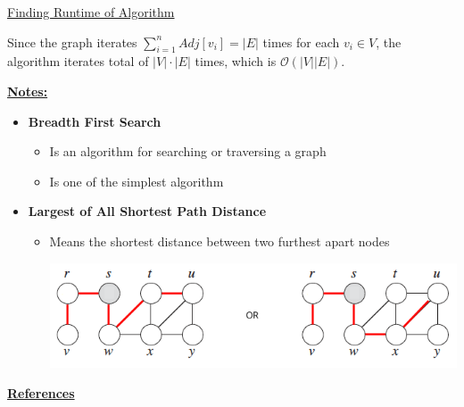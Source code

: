\documentclass[12pt]{article}
\begin{document}
\begin{enumerate}[1.]
    \bigskip

    \underline{Finding Runtime of Algorithm}

    \bigskip

    Since the graph iterates $\sum\limits_{i=1}^n Adj[v_i] = \lvert E \rvert$
    times for each $v_i \in V$, the algorithm iterates total of $\lvert V \rvert \cdot \lvert E \rvert$ times,
    which is $\mathcal{O}(\lvert V \rvert \lvert E \rvert)$.


    \bigskip

    \underline{\textbf{Notes:}}

    \bigskip

    \begin{itemize}
        \item \textbf{Breadth First Search}

        \begin{itemize}
            \item Is an algorithm for searching or traversing a graph
            \item Is one of the simplest algorithm
        \end{itemize}

        \item \textbf{Largest of All Shortest Path Distance}

        \bigskip

        \begin{itemize}
            \item Means the shortest distance between two furthest apart nodes

            \bigskip

            \begin{center}
            \includegraphics[width=\linewidth]{images/worksheet_4_solution_20.png}
            \end{center}
        \end{itemize}
    \end{itemize}

    \bigskip

    \underline{\textbf{References}}

    \bigskip


\end{enumerate}
\end{document}
